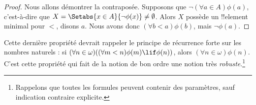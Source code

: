 \documentclass[../../../include/open-logic-section]{subfiles}
\begin{document}
\begin{proof}
Nous allons démontrer la contraposée. Supposons que
$\lnot(\forall a \in A)\phi(a)$, c'est-à-dire que
$X = \Setabs{x \in A}{\lnot\phi(x)} \neq \emptyset$. Alors $X$
possède un !!{element} minimal pour $<$, disons $a$. Nous avons donc
$(\forall b < a)\phi(b)$, mais $\lnot \phi(a)$.
\end{proof}\noindent Cette dernière propriété devrait rappeler le
principe de récurrence forte sur les nombres naturels : si
$(\forall n \in \omega)((\forall m < n)\phi(m) \lif \phi(n))$, alors
$(\forall n \in \omega)\phi(n)$. C'est cette propriété qui fait de
la notion de bon ordre une notion très \emph{robuste}.\footnote{Rappelons
que toutes les formules peuvent contenir des paramètres, sauf indication
contraire explicite.}
\end{document}
